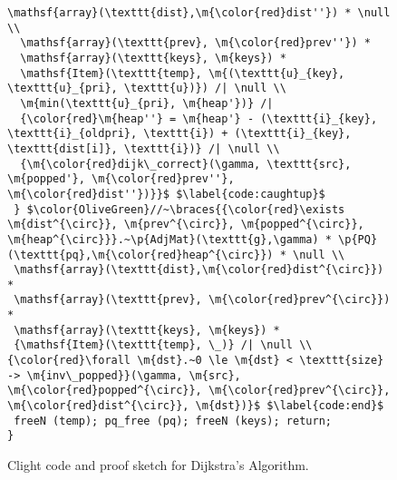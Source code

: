 \begin{figure}[t]
\begin{lstlisting}[mathescape=true,showlines=true]
  \mathsf{array}(\texttt{dist},\m{\color{red}dist''}) * \null \\
  \mathsf{array}(\texttt{prev}, \m{\color{red}prev''}) *
  \mathsf{array}(\texttt{keys}, \m{keys}) *
  \mathsf{Item}(\texttt{temp}, \m{(\texttt{u}_{key}, \texttt{u}_{pri}, \texttt{u})}) /| \null \\
  \m{min(\texttt{u}_{pri}, \m{heap'})} /|
  {\color{red}\m{heap''} = \m{heap'} - (\texttt{i}_{key}, \texttt{i}_{oldpri}, \texttt{i}) + (\texttt{i}_{key}, \texttt{dist[i]}, \texttt{i})} /| \null \\
  {\m{\color{red}dijk\_correct}(\gamma, \texttt{src}, \m{popped'}, \m{\color{red}prev''}, \m{\color{red}dist''})}}$ $\label{code:caughtup}$
 } $\color{OliveGreen}//~\braces{{\color{red}\exists \m{dist^{\circ}}, \m{prev^{\circ}}, \m{popped^{\circ}}, \m{heap^{\circ}}}.~\p{AdjMat}(\texttt{g},\gamma) * \p{PQ}(\texttt{pq},\m{\color{red}heap^{\circ}}) * \null \\
 \mathsf{array}(\texttt{dist},\m{\color{red}dist^{\circ}}) * 
 \mathsf{array}(\texttt{prev}, \m{\color{red}prev^{\circ}}) *
 \mathsf{array}(\texttt{keys}, \m{keys}) * 
 {\mathsf{Item}(\texttt{temp}, \_)} /| \null \\
{\color{red}\forall \m{dst}.~0 \le \m{dst} < \texttt{size} -> \m{inv\_popped}}(\gamma, \m{src}, \m{\color{red}popped^{\circ}}, \m{\color{red}prev^{\circ}}, \m{\color{red}dist^{\circ}}, \m{dst})}$ $\label{code:end}$
 freeN (temp); pq_free (pq); freeN (keys); return; 
}
\end{lstlisting}
\vspace{-1em}
\caption{Clight code and proof sketch for Dijkstra's Algorithm.}
\vspace{-1em}
\label{fig:decorated}
\end{figure} 